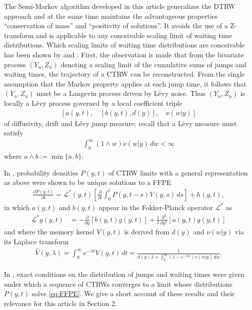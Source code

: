 \documentclass[a4paper,12pt]{elsarticle}
\numberwithin{equation}{section}
\theoremstyle{plain}
\theoremstyle{definition}
\theoremstyle{remark}
\numberwithin{equation}{section}
\newcommand{\1}{\mathbf 1}
\newcommand{\del}{\partial}
\begin{document}
The Semi-Markov algorithm developed in this article generalizes the DTRW approach and at the same time maintains the advantageous properties ``conservation of mass'' and ``positivity of solutions''.  It avoids the use of a Z-transform and is applicable to any conceivable scaling limit of waiting time distributions.  Which scaling limits of waiting time distributions are conceivable has been shown by \cite{Straka17} and \cite{BaeumerStraka16}:  First, the observation is made that from the bivariate process $(Y_u, Z_u)$ denoting a scaling limit of the cumulative sums of jumps and waiting times, the trajectory of a CTRW can be reconstructed.
From the single assumption that the Markov property applies at each jump time, it follows that $(Y_u,Z_u)$ must be a Langevin process driven by L\'evy noise.
Thus $(Y_u, Z_u)$ is locally a L\'evy process governed by a local coefficient triple
\begin{align} \label{eq:triple}
[a(y,t), \quad [b(y,t), d(y)], \quad \nu(w|y)]
\end{align}
of diffusivity, drift  and L\'evy jump measure; recall that a L\'evy measure must satisfy
\begin{align}
\label{eq:Levy-measure}
\int_0^\infty (1 \wedge w) \nu(w|y)\,dw < \infty
\end{align}
where $a \wedge b := \min\{a, b\}$.

In \citep{BaeumerStraka16}, probability densities $P(y,t)$ of CTRW limits with a general representation as above were shown to be unique solutions to a FFPE
\begin{align} \label{eq:FFPE}
\frac{\del P(y,t)}{\del t} = \mathcal L^*(y,t) \left[ \frac{\partial}{\partial t}
\int_0^t P(y,t-s) V(y,s)\,ds \right] + h(y,t),
\end{align}
in which $a(y,t)$ and $b(y,t)$ appear in the Fokker-Planck operator
$\mathcal L^*$ as
\begin{align}
\label{eq:FPop}
\mathcal L^* g(y,t)
&= -\frac{\partial }{\partial y}[b(y,t) g(y,t)]
+\frac{1}{2}\frac{\partial^2 }{\partial y^2}[a(y,t) g(y,t)]
\end{align}
and where the memory kernel $V(y,t)$ is derived from $d(y)$ and $\nu(w|y)$ via its Laplace transform
\begin{align} \label{eq:LT-renewal-measure}
\hat V(y,\lambda) = \int_0^\infty e^{-\lambda t} V(y,t)\,dt
= \frac{1}{d(y)\lambda + \int_0^\infty (1-e^{-\lambda w})
\nu(w | y)\,dw}.
\end{align}

In \citep{Straka17}, exact conditions on the distribution of jumps and waiting times were given under which a sequence of CTRWs converges to a limit whose distributions $P(y,t)$ solve \eqref{eq:FFPE}.
We give a short account of these results and their relevance for this article in Section 2.
\end{document}
